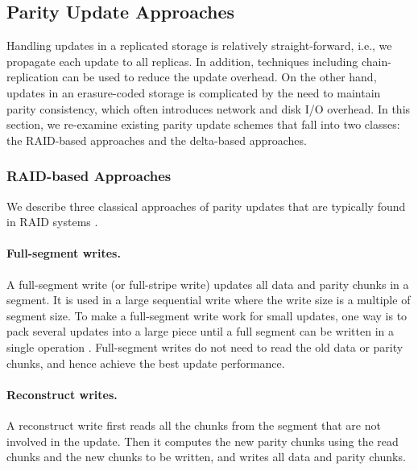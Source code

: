 \subsection{Parity Update Approaches}
\label{sec:parity_background}

Handling updates in a replicated storage is relatively straight-forward, i.e., we 
propagate each update to all replicas. In addition, techniques including 
chain-replication \cite{vanRenesse04} can be used to reduce the update overhead.
On the other hand, updates in an erasure-coded storage is complicated by the
need to maintain parity consistency, which often introduces network and disk I/O
overhead.
In this section, we re-examine existing parity update schemes
that fall into two classes: the RAID-based approaches and the delta-based
approaches. 


\subsubsection{RAID-based Approaches}

We describe three classical approaches of parity updates that are typically
found in RAID systems \cite{chen95,thomasian05}. 


\paragraph{Full-segment writes.} A full-segment write (or full-stripe write)
updates all data and parity chunks in a segment. 
It is used in a large sequential
write where the write size is a multiple of segment size.  To make a
full-segment write work for small updates, one way is to pack several updates
into a large piece until a full segment can be written in a single operation 
\cite{menon95}. Full-segment writes do not need to read the old data or parity
chunks, and hence achieve the best update performance.


\paragraph{Reconstruct writes.} A reconstruct write first reads all the chunks
from the segment that are not involved in the update.  Then it computes the new parity chunks
using the read chunks and the new chunks to be written, and writes all data
and parity chunks. 

